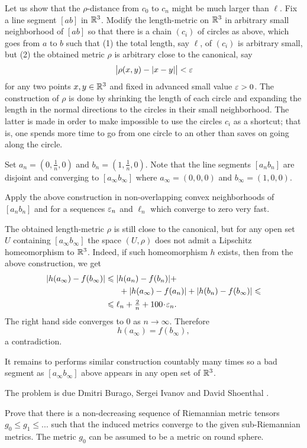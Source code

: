 Let us show that the $\rho$-distance from $c_0$ to $c_n$ might be much larger than $\ell$.
Fix a line segment $[ab]$ in $\mathbb{R}^3$.
Modify 
the length-metric on $\mathbb{R}^3$ in arbitrary small neighborhood of $[ab]$
so that there is a chain $(c_i)$ of circles as above,
which goes from $a$ to $b$ 
such that
(1) the total length, say $\ell$, 
of $(c_i)$ is arbitrary small,
but 
(2) the obtained metric $\rho$ 
is arbitrary close to the canonical, say
\[\bigl|\rho(x,y)-|x-y|\bigr|<\varepsilon\]
for any two points $x,y\in\mathbb{R}^3$
and fixed in advanced small value $\varepsilon>0$.
The construction of $\rho$ 
is done by shrinking the length of each circle
and expanding the length in the normal directions  
to the circles in their small neighborhood.
The latter is made in order to make impossible to use the circles $c_i$ as a shortcut;
that is, one spends more time to go from one circle to an other 
than saves on going along the circle.

Set $a_n=(0,\tfrac1n,0)$ and $b_n=(1,\tfrac1n,0)$.
Note that the line segments $[a_nb_n]$ are disjoint and converging
to $[a_\infty b_\infty]$
where $a_\infty=(0,0,0)$ and $b_\infty=(1,0,0)$.

Apply the above construction in non-overlapping convex neighborhoods of $[a_nb_n]$ 
and for a sequences 
$\varepsilon_n$ and $\ell_n$ 
which converge to zero very fast.

The obtained length-metric $\rho$ is still close to the canonical,
but for any open set $U$ containing $[a_\infty b_\infty]$
the space $(U,\rho)$ does not admit 
a Lipschitz homeomorphism to $\mathbb{R}^3$.
Indeed, 
if such homeomorphism $h$ exists, 
then 
from the above construction,
we get 
\begin{align*}
|h(a_\infty)-f(b_\infty)|
&\le 
|h(a_n)-f(b_n)|
+
\\
&\ \ \ \ \ +
|h(a_\infty)-f(a_n)|
+
|h(b_n)-f(b_\infty)|
\le
\\
&\le
\ell_n+\tfrac2n+100\cdot\eps_n.
\end{align*}
The right hand side converges to $0$ as $n\to\infty$.
Therefore 
\[h(a_\infty)=f(b_\infty),\] 
a contradiction.

It remains to performs similar construction countably many times so a bad segment as $[a_\infty b_\infty]$ above
appears in any open set of $\mathbb{R}^3$.\qeds



The problem is due
Dmitri Burago, 
Sergei Ivanov 
and David Shoenthal \cite[see][]{BIS}.

Prove that there is a non-decreasing sequence of Riemannian metric tensors
$g_0\le g_1\le ...$ such that the induced metrics converge to the given sub-Riemannian metrics.
The metric $g_0$ can be assumed to be a metric on round sphere.

